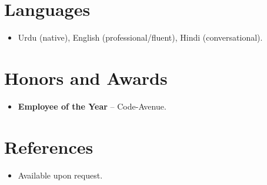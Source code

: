 \documentclass[11pt,a4paper,sans]{moderncv}
\begin{document}
\section{Languages}
\vspace{1pt}
\begin{itemize}
\item Urdu (native), English (professional/fluent), Hindi (conversational).
\end{itemize}

\section{Honors and Awards}
\vspace{1pt}
\begin{itemize}
\item{\textbf{Employee of the Year} -- Code-Avenue.}
\end{itemize}

\section{References}
\vspace{1pt}
\begin{itemize}
\item{Available upon request.}
\end{itemize}
\end{document}
